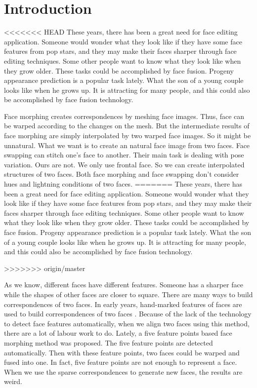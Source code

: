 \section{Introduction}





<<<<<<< HEAD
These years, there has been a great need for face editing application.
Someone would wonder what they look like if they have some face features from pop stars, and they may make their faces sharper through face editing techniques.
Some other people want to know what they look like when they grow older.
These tasks could be accomplished by face fusion.
Progeny appearance prediction is a popular task lately. What the son of a young couple looks like when he grows up. It is attracting for many people, and this could also be accomplished by face fusion technology.

Face morphing creates correspondences by meshing face images\cite{mhf,wol}. Thus, face can be warped according to the changes on  the mesh. But the intermediate results of face morphing are simply interpolated by two warped face images. So it might be unnatural. What we want is to create an natural face image from two faces. Face swapping can stitch one's face to another. Their main task is dealing with pose variation. Ours are not. We only use frontal face. So we can create interpolated structures of two faces. Both face morphing and face swapping don't consider hues and lightning conditions of two faces.
=======
These years, there has been a great need for face editing application. 
Someone would wonder what they look like if they have some face features from pop stars, and they may make their faces sharper through face editing techniques. 
Some other people want to know what they look like when they grow older. 
These tasks could be accomplished by face fusion. 
Progeny appearance prediction is a popular task lately. What the son of a young couple looks like when he grows up. It is attracting for many people, and this could also be accomplished by face fusion technology.


>>>>>>> origin/master

As we know, different faces have different features. Someone has a sharper face while the shapes of other faces are closer to square. There are many ways to build correspondences of two faces. In early years, hand-marked features of faces are used to build correspondences of two faces \cite{fbim}. Because of the lack of the technology to detect face features automatically, when we align two faces using this method, there are a lot of labour work to do. Lately, a five feature points based face morphing method \cite{mhf} was proposed. The five feature points are detected automatically. Then with these feature points, two faces could be warped and fused into one. In fact, five feature points are not enough to represent a face. When we use the sparse correspondences to generate new faces, the results are weird.


